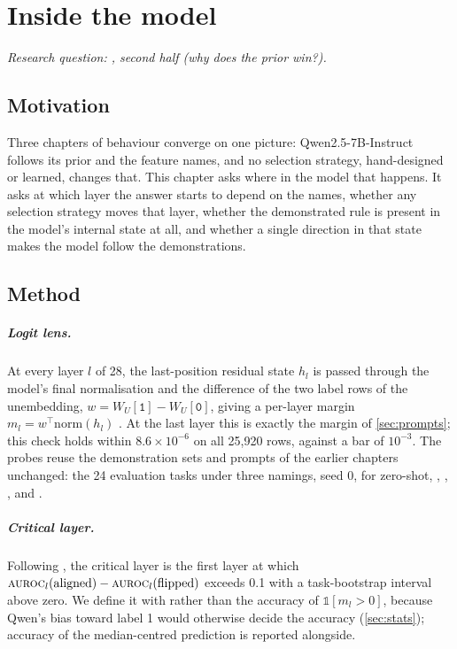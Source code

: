 \chapter{Inside the model}
\label{ch:mechanism}

\emph{Research question: , second half (why does the prior win?).}

\section{Motivation}

Three chapters of behaviour converge on one picture: Qwen2.5-7B-Instruct follows its prior and the feature names, and no selection strategy, hand-designed or learned, changes that.
This chapter asks where in the model that happens.
It asks at which layer the answer starts to depend on the names, whether any selection strategy moves that layer, whether the demonstrated rule is present in the model's internal state at all, and whether a single direction in that state makes the model follow the demonstrations.

\section{Method}

\paragraph{Logit lens.}
At every layer $l$ of 28, the last-position residual state $h_l$ is passed through the model's final normalisation and the difference of the two label rows of the unembedding, $w = W_U[\texttt{1}] - W_U[\texttt{0}]$, giving a per-layer margin $m_l = w^\top \mathrm{norm}(h_l)$ \citep{nostalgebraist2020logit,elhage2021mathematical}.
At the last layer this is exactly the margin of \autoref{sec:prompts}; this check holds within $8.6 \times 10^{-6}$ on all 25,920 rows, against a bar of $10^{-3}$.
The probes reuse the demonstration sets and prompts of the earlier chapters unchanged: the 24 evaluation tasks under three namings, seed 0, for zero-shot, , , , \sata and \satami.

\paragraph{Critical layer.}
Following \citet{halawi2024overthinking}, the critical layer is the first layer at which $\textsc{auroc}_l(\text{aligned}) - \textsc{auroc}_l(\text{flipped})$ exceeds 0.1 with a task-bootstrap interval above zero.
We define it with \AUROC rather than the accuracy of $\mathbb{1}[m_l > 0]$, because Qwen's bias toward label 1 would otherwise decide the accuracy (\autoref{sec:stats}); accuracy of the median-centred prediction is reported alongside.

